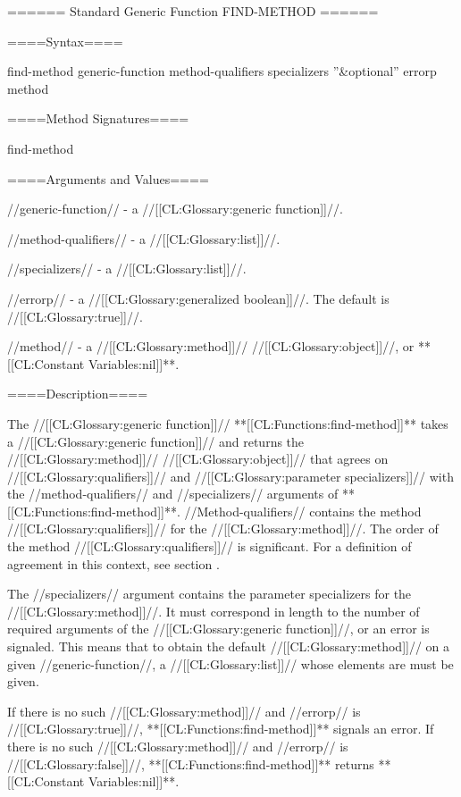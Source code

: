 ====== Standard Generic Function FIND-METHOD ======

====Syntax====

\DefgenWithValuesNewline find-method {generic-function method-qualifiers specializers ''&optional'' errorp} {method}

====Method Signatures====

\Defmeth find-method {}

====Arguments and Values====

//generic-function// - a //[[CL:Glossary:generic function]]//.

//method-qualifiers// - a //[[CL:Glossary:list]]//.

//specializers// - a //[[CL:Glossary:list]]//.

//errorp// - a //[[CL:Glossary:generalized boolean]]//. The default is //[[CL:Glossary:true]]//.

//method// - a //[[CL:Glossary:method]]// //[[CL:Glossary:object]]//, or **[[CL:Constant Variables:nil]]**.

====Description====

The //[[CL:Glossary:generic function]]// **[[CL:Functions:find-method]]** takes a //[[CL:Glossary:generic function]]// and returns the //[[CL:Glossary:method]]// //[[CL:Glossary:object]]// that agrees on //[[CL:Glossary:qualifiers]]// and //[[CL:Glossary:parameter specializers]]// with the //method-qualifiers// and //specializers// arguments of **[[CL:Functions:find-method]]**. //Method-qualifiers// contains the method //[[CL:Glossary:qualifiers]]// for the //[[CL:Glossary:method]]//. The order of the method //[[CL:Glossary:qualifiers]]// is significant. For a definition of agreement in this context, see section {\secref\SpecializerQualifierAgreement}.

The //specializers// argument contains the parameter specializers for the //[[CL:Glossary:method]]//. It must correspond in length to the number of required arguments of the //[[CL:Glossary:generic function]]//, or an error is signaled. This means that to obtain the default //[[CL:Glossary:method]]// on a given //generic-function//, a //[[CL:Glossary:list]]// whose elements are  must be given.

If there is no such //[[CL:Glossary:method]]// and //errorp// is //[[CL:Glossary:true]]//, **[[CL:Functions:find-method]]** signals an error. If there is no such //[[CL:Glossary:method]]// and //errorp// is //[[CL:Glossary:false]]//, **[[CL:Functions:find-method]]** returns **[[CL:Constant Variables:nil]]**.

